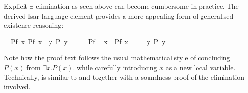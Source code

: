 \begin{isabellebody}
\begin{isamarkuptext}
\noindent Explicit $\exists$-elimination as seen above can become
cumbersome in practice.  The derived Isar language element
 provides a more appealing form of generalised
existence reasoning:%
\end{isamarkuptext}%
\isamarkuptrue%
\isamarkupfalse%
\ \ Pf{}\ {}{}x{}\ P{}f\ x{}{}\ \ {}{}y{}\ P\ y{}\isanewline
%
\isadelimproof
%
\endisadelimproof
%
\isatagproof
{}\isamarkupfalse%
\ {}\isanewline
\ \ \isamarkupfalse%
\ Pf\ \isamarkupfalse%
\ x\ \ {}P{}f\ x{}{}\ \isamarkupfalse%
\isanewline
\ \ \isamarkupfalse%
\ {}{}y{}\ P\ y{}\ \isamarkupfalse%
\isanewline
{}\isamarkupfalse%
%
\endisatagproof
{\isafoldproof}%
%
\isadelimproof
%
\endisadelimproof
%
\begin{isamarkuptext}%
\noindent Note how the proof text follows the usual mathematical style
of concluding $P(x)$ from $\exists x. P(x)$, while carefully introducing $x$
as a new local variable.  Technically,  is similar to
 and  together with a soundness proof of
the elimination involved.


\end{isamarkuptext}
\end{isabellebody}
